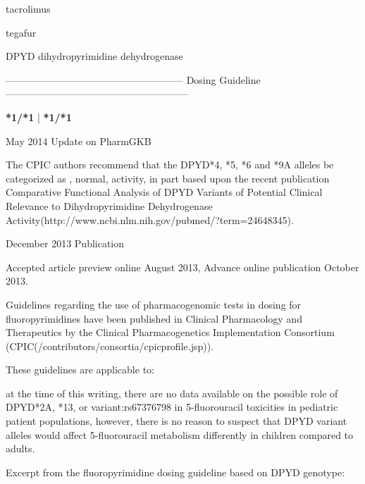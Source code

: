 \documentclass{resume} %
\begin{document}
\begin{rSection}{ tacrolimus }
\end{rSection}\begin{rSection}{ tegafur }
\item[]
\begin{rSubsection}{ DPYD }{ dihydropyrimidine dehydrogenase }{}{}
\item[]
\item[] ------------------------------------------------------ Dosing Guideline --------------------------------------------------------\newline
\item[]
\item[] \textbf{ *1/*1 } | \textbf{ *1/*1 }
\item May 2014 Update on PharmGKB
 \newline
\item The CPIC authors recommend that the DPYD*4, *5, *6 and *9A alleles be categorized as , normal,  activity, in part based upon the recent publication Comparative Functional Analysis of DPYD Variants of Potential Clinical Relevance to Dihydropyrimidine Dehydrogenase Activity(http://www.ncbi.nlm.nih.gov/pubmed/?term=24648345). 
 \newline
\item December 2013 Publication
 \newline
\item Accepted article preview online August 2013,  Advance online publication October 2013.
 \newline
\item Guidelines regarding the use of pharmacogenomic tests in dosing for fluoropyrimidines have been published in Clinical Pharmacology and Therapeutics by the Clinical Pharmacogenetics Implementation Consortium (CPIC(/contributors/consortia/cpicprofile.jsp)).
 \newline
\item These guidelines are applicable to:
 \newline
\item at the time of this writing, there are no data available on the possible role of DPYD*2A, *13, or variant:rs67376798 in 5-fluorouracil toxicities in pediatric patient populations,  however, there is no reason to suspect that DPYD variant alleles would affect 5-fluorouracil metabolism differently in children compared to adults.
 \newline
\item Excerpt from the fluoropyrimidine dosing guideline based on DPYD genotype:
 \newline

\end{rSubsection}
\end{rSection}
\end{document}
